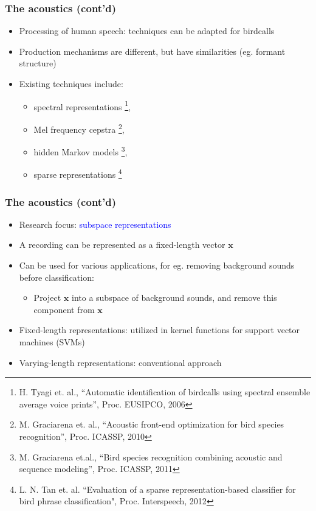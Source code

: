 \documentclass[mathserif]{beamer}
\begin{document}
\begin{frame}
\frametitle{The acoustics (cont'd)}
\begin{itemize}
\item<2-> Processing of human speech: techniques can be adapted for birdcalls
\item<3-> Production mechanisms are different, but have similarities (eg. formant
structure)
\item<4-> Existing techniques include:
\begin{itemize}
	\item spectral representations \footnote{
	H. Tyagi et. al., ``Automatic identification of birdcalls using spectral 
	ensemble average voice prints'', Proc. EUSIPCO, 2006},
	\item Mel frequency cepstra \footnote{M. Graciarena et. al., 
	``Acoustic front-end optimization for bird species recognition'', 
	Proc. ICASSP, 2010}, 
	\item hidden Markov models \footnote{M. Graciarena et.al., 
	``Bird species recognition combining acoustic and sequence modeling'', 
	Proc. ICASSP, 2011}, 
	\item sparse representations \footnote{L. N. Tan et. al. 
	``Evaluation of a sparse representation-based classifier for bird phrase 
	classification", Proc. Interspeech, 2012}
\end{itemize}
\end{itemize}
\end{frame}


\begin{frame}
\frametitle{The acoustics (cont'd)}
\begin{itemize}
\item<2-> Research focus: \textcolor{blue}{subspace representations} 
\item<3-> A recording can be represented as a fixed-length vector $\mathbf{x}$ 
\item<4-> Can be used for various applications, for eg. removing background
sounds before classification:
\begin{itemize}
	\item<5-> Project $\mathbf{x}$ into a subspace of background sounds, and remove this
	component from $\mathbf{x}$
\end{itemize}
\item <6-> Fixed-length representations: utilized in kernel functions for
support vector machines (SVMs)
\item <7-> Varying-length representations: conventional approach
\end{itemize}
\end{frame}
\end{document}
